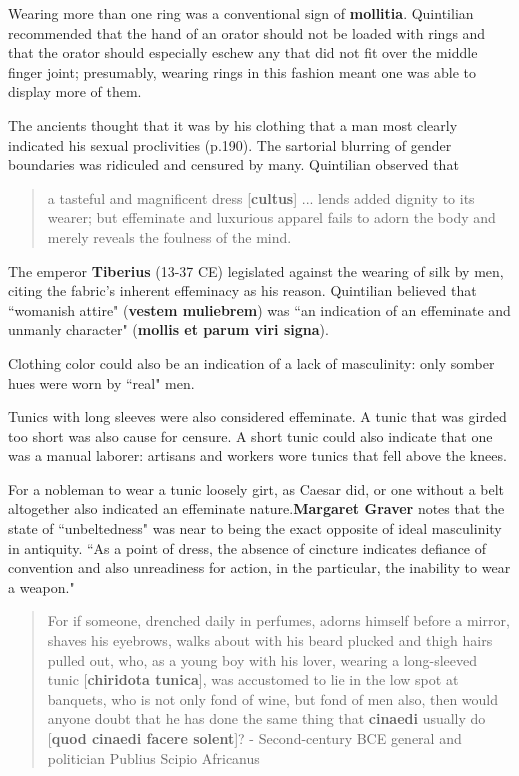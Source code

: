Wearing more than one ring was a conventional sign of \textbf{mollitia}. Quintilian recommended that the hand of an orator should not be loaded with rings and that the orator should especially eschew any that did not fit over the middle finger joint; presumably, wearing rings in this fashion meant one was able to display more of them.

The ancients thought that it was by his clothing that a man most clearly indicated his sexual proclivities (p.190). The sartorial blurring of gender boundaries was ridiculed and censured by many. Quintilian observed that 
\begin{quotation}
    a tasteful and magnificent dress [\textbf{cultus}] ... lends added dignity to its wearer; but effeminate and luxurious apparel fails to adorn the body and merely reveals the foulness of the mind.
\end{quotation}

The emperor \textbf{Tiberius} (13-37 CE) legislated against the wearing of silk by men, citing the fabric's inherent effeminacy as his reason. Quintilian believed that ``womanish attire" (\textbf{vestem muliebrem}) was ``an indication of an effeminate and unmanly character" (\textbf{mollis et parum viri signa}).

Clothing color could also be an indication of a lack of masculinity: only somber hues were worn by ``real" men.

Tunics with long sleeves were also considered effeminate. A tunic that was girded too short was also cause for censure. A short tunic could also indicate that one was a manual laborer: artisans and workers wore tunics that fell above the knees. 

For a nobleman to wear a tunic loosely girt, as Caesar did, or one without a belt altogether also indicated an effeminate nature.\textbf{Margaret Graver} notes that the state of ``unbeltedness" was near to being the exact opposite of ideal masculinity in antiquity. ``As a point of dress, the absence of cincture indicates defiance of convention and also unreadiness for action, in the particular, the inability to wear a weapon."

\begin{quotation}
    For if someone, drenched daily in perfumes, adorns himself before a mirror, shaves his eyebrows, walks about with his beard plucked and thigh hairs pulled out, who, as a young boy with his lover, wearing a long-sleeved tunic [\textbf{chiridota tunica}], was accustomed to lie in the low spot at banquets, who is not only fond of wine, but fond of men also, then would anyone doubt that he has done the same thing that \textbf{cinaedi} usually do [\textbf{quod cinaedi facere solent}]? - Second-century BCE general and politician Publius Scipio Africanus
\end{quotation}


